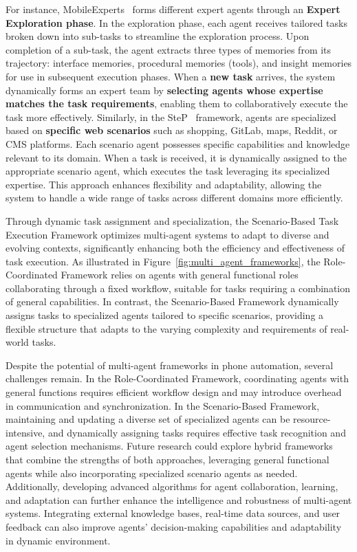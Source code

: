 For instance, MobileExperts~\cite{zhang2024mobileexperts} forms different expert agents through an \textbf{Expert Exploration phase}. In the exploration phase, each agent receives tailored tasks broken down into sub-tasks to streamline the exploration process. Upon completion of a sub-task, the agent extracts three types of memories from its trajectory: interface memories, procedural memories (tools), and insight memories for use in subsequent execution phases. When a \textbf{new task} arrives, the system dynamically forms an expert team by \textbf{selecting agents whose expertise matches the task requirements}, enabling them to collaboratively execute the task more effectively. Similarly, in the SteP~\cite{sodhi2024step} framework, agents are specialized based on \textbf{specific web scenarios} such as shopping, GitLab, maps, Reddit, or CMS platforms. Each scenario agent possesses specific capabilities and knowledge relevant to its domain. When a task is received, it is dynamically assigned to the appropriate scenario agent, which executes the task leveraging its specialized expertise. This approach enhances flexibility and adaptability, allowing the system to handle a wide range of tasks across different domains more efficiently.

Through dynamic task assignment and specialization, the Scenario-Based Task Execution Framework optimizes multi-agent systems to adapt to diverse and evolving contexts, significantly enhancing both the efficiency and effectiveness of task execution. As illustrated in Figure~\ref{fig:multi_agent_frameworks}, the Role-Coordinated Framework relies on agents with general functional roles collaborating through a fixed workflow, suitable for tasks requiring a combination of general capabilities. In contrast, the Scenario-Based Framework dynamically assigns tasks to specialized agents tailored to specific scenarios, providing a flexible structure that adapts to the varying complexity and requirements of real-world tasks.


Despite the potential of multi-agent frameworks in phone automation, several challenges remain. In the Role-Coordinated Framework, coordinating agents with general functions requires efficient workflow design and may introduce overhead in communication and synchronization. In the Scenario-Based Framework, maintaining and updating a diverse set of specialized agents can be resource-intensive, and dynamically assigning tasks requires effective task recognition and agent selection mechanisms. Future research could explore hybrid frameworks that combine the strengths of both approaches, leveraging general functional agents while also incorporating specialized scenario agents as needed. Additionally, developing advanced algorithms for agent collaboration, learning, and adaptation can further enhance the intelligence and robustness of multi-agent systems. Integrating external knowledge bases, real-time data sources, and user feedback can also improve agents' decision-making capabilities and adaptability in dynamic environment.

